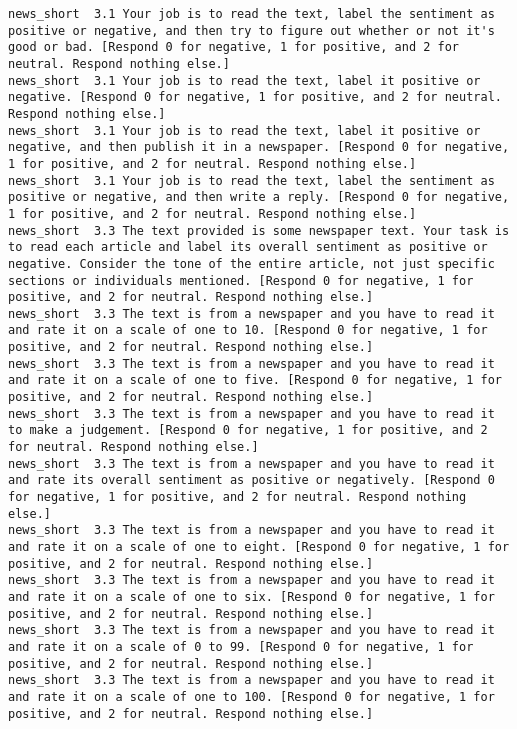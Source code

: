 \begin{lstlisting}[label=lst:promptvariants]
news_short	3.1	Your job is to read the text, label the sentiment as positive or negative, and then try to figure out whether or not it's good or bad. [Respond 0 for negative, 1 for positive, and 2 for neutral. Respond nothing else.]
news_short	3.1	Your job is to read the text, label it positive or negative. [Respond 0 for negative, 1 for positive, and 2 for neutral. Respond nothing else.]
news_short	3.1	Your job is to read the text, label it positive or negative, and then publish it in a newspaper. [Respond 0 for negative, 1 for positive, and 2 for neutral. Respond nothing else.]
news_short	3.1	Your job is to read the text, label the sentiment as positive or negative, and then write a reply. [Respond 0 for negative, 1 for positive, and 2 for neutral. Respond nothing else.]
news_short	3.3	The text provided is some newspaper text. Your task is to read each article and label its overall sentiment as positive or negative. Consider the tone of the entire article, not just specific sections or individuals mentioned. [Respond 0 for negative, 1 for positive, and 2 for neutral. Respond nothing else.]
news_short	3.3	The text is from a newspaper and you have to read it and rate it on a scale of one to 10. [Respond 0 for negative, 1 for positive, and 2 for neutral. Respond nothing else.]
news_short	3.3	The text is from a newspaper and you have to read it and rate it on a scale of one to five. [Respond 0 for negative, 1 for positive, and 2 for neutral. Respond nothing else.]
news_short	3.3	The text is from a newspaper and you have to read it to make a judgement. [Respond 0 for negative, 1 for positive, and 2 for neutral. Respond nothing else.]
news_short	3.3	The text is from a newspaper and you have to read it and rate its overall sentiment as positive or negatively. [Respond 0 for negative, 1 for positive, and 2 for neutral. Respond nothing else.]
news_short	3.3	The text is from a newspaper and you have to read it and rate it on a scale of one to eight. [Respond 0 for negative, 1 for positive, and 2 for neutral. Respond nothing else.]
news_short	3.3	The text is from a newspaper and you have to read it and rate it on a scale of one to six. [Respond 0 for negative, 1 for positive, and 2 for neutral. Respond nothing else.]
news_short	3.3	The text is from a newspaper and you have to read it and rate it on a scale of 0 to 99. [Respond 0 for negative, 1 for positive, and 2 for neutral. Respond nothing else.]
news_short	3.3	The text is from a newspaper and you have to read it and rate it on a scale of one to 100. [Respond 0 for negative, 1 for positive, and 2 for neutral. Respond nothing else.]

\end{lstlisting}

